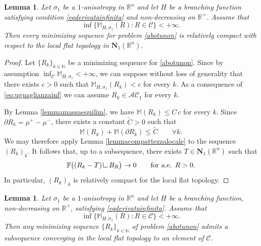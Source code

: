 \documentclass{article}
\numberwithin{equation}{section}
\theoremstyle{plain}%
\newtheorem{lemma}[theorem]{Lemma}
\theoremstyle{definition}
\theoremstyle{definition}
\newcommand{\rgrande}{\mathbb{R}}
\newcommand{\ngrande}{\mathbb{N}}
\newcommand{\corrnormvar}[2]{\mathbf{N}_{#1}(\rgrande^{#2})}
\newcommand{\massa}{\mathbb{M}}
\newcommand{\massaanisotropauno}{\mathbb{M}_{H,\sigma_1}}
\newcommand{\mrestr}{\mathop{\hbox{\vrule height 7pt width 0.5pt depth 0pt
\vrule height 0.5pt width 6pt depth 0pt}}\nolimits}
\begin{document}
\begin{lemma}\label{lemmacompattezzasuccminimizz}
    Let $\sigma_1$ be a $1$-anisotropy in $\rgrande^n$ and let $H$ be a branching function satisfying condition \eqref{eqderivatainfinita} and non-decreasing on $\rgrande^+$. Assume that
    $$
    \inf \{ \massaanisotropauno(R) : R \in \mathcal{C} \} < +\infty.
    $$
    Then every minimizing sequence for problem \eqref{abotunon} is relatively compact with respect to the local flat topology in $\corrnormvar{1}{n}$.
\end{lemma}
\begin{proof}
    Let $\{ R_k\}_{k \in \ngrande}$ be a minimizing sequence for \eqref{abotunon}. Since by assumption $\inf_{\mathcal{C}} \massaanisotropauno < + \infty$, we can suppose without loss of generality that there exists $c > 0$ such that $\massaanisotropauno (R_k) < c$ for every $k$. As a consequence of \eqref{eq:uguaglianzainf} we can assume $R_k \in \mathcal{AC}_1$ for every $k$.

    By Lemma \ref{lemmamassaequilim}, we have $\massa (R_k) \leq C\, c$ for every $k$. Since $\partial R_k = \mu^+ - \mu^-$, there exists a constant $\widetilde C>0$ such that
    $$
    \mathbb M(R_k)+\mathbb M(\partial R_k)\le \widetilde C
    \qquad \forall k.
    $$
    We may therefore apply Lemma \ref{lemmacompattezzalocale} to the sequence $(R_k)_k$. It follows that, up to a subsequence, there exists $T\in \corrnormvar{1}{n}$ such that
    $$
    \mathbb F\bigl((R_k-T)\mrestr B_R\bigr)\to 0
    \qquad \text{for a.e. }R>0.
    $$
    In particular, $(R_k)_k$ is relatively compact for the local flat topology.
\end{proof}

\begin{lemma}\label{lemmacompattezza}
    Let $\sigma_1$ be a $1$-anisotropy in $\rgrande^n$ and let $H$ be a branching function, non-decreasing on $\rgrande^+$, satisfying \eqref{eqderivatainfinita}. Assume that
    $$
    \inf \{ \massaanisotropauno(R) : R \in \mathcal{C} \} < +\infty.
    $$
    Then any minimizing sequence $\{ R_k \}_{k \in \ngrande}$ of problem \eqref{abotunon} admits a subsequence converging in the local flat topology to an element of $\mathcal{C}$.
\end{lemma}
\end{document}
